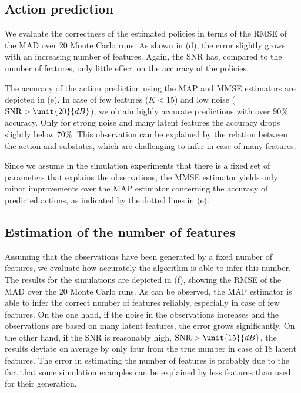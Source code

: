 \documentclass{article}
\begin{document}
\subsection{Action prediction}
We evaluate the correctness of the estimated policies in terms of the \ac{RMSE} of the \ac{MAD} over 20 Monte Carlo runs.
As shown in (d), the error slightly grows with an increasing number of features. 
Again, the \ac{SNR} has, compared to the number of features, only little effect on the accuracy of the policies.

The accuracy of the action prediction using the \ac{MAP} and \ac{MMSE} estimators are depicted in (e).
In case of few features ($K<15$) and low noise ($\SNR > \unit{20}{dB}$), we obtain highly accurate predictions with over \unit{90}{\%} accuracy. 
Only for strong noise and many latent features the accuracy drops slightly below \unit{70}{\%}.
This observation can be explained by the relation between the action and substates, which are challenging to infer in case of many features.

Since we assume in the simulation experiments that there is a fixed set of parameters that explains the observations, the \ac{MMSE} estimator yields only minor improvements over the \ac{MAP} estimator concerning the accuracy of predicted actions, as indicated by the dotted lines in (e).

\subsection{Estimation of the number of features}
Assuming that the observations have been generated by a fixed number of features, we evaluate how accurately the algorithm is able to infer this number.
The results for the simulations are depicted in (f), showing the \ac{RMSE} of the \ac{MAD} over the 20 Monte Carlo runs.
As can be observed, the \ac{MAP} estimator is able to infer the correct number of features reliably, especially in case of few features.
On the one hand, if the noise in the observations increases and the observations are based on many latent features, the error grows significantly.
On the other hand, if the \ac{SNR} is reasonably high, \ie $\SNR > \unit{15}{dB}$, the results deviate on average by only four from the true number in case of 18 latent features. 
The error in estimating the number of features is probably due to the fact that some simulation examples can be explained by less features than used for their generation.
\end{document}
